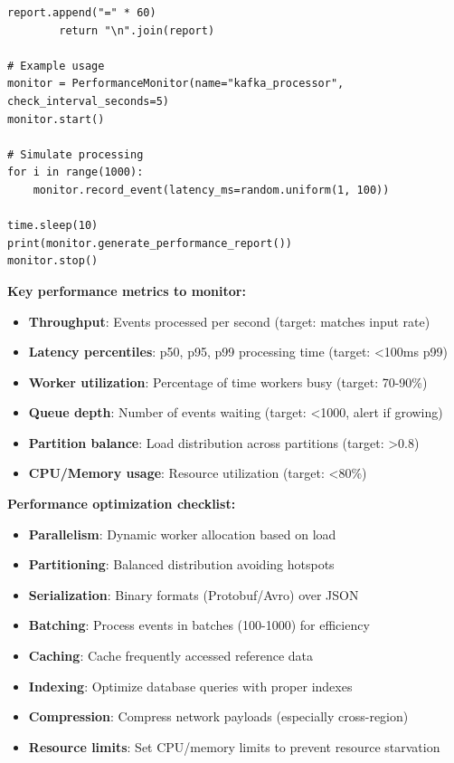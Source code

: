 \begin{lstlisting}[style=python, caption={Performance Monitor with Bottleneck Detection}]
        report.append("=" * 60)
        return "\n".join(report)

# Example usage
monitor = PerformanceMonitor(name="kafka_processor", check_interval_seconds=5)
monitor.start()

# Simulate processing
for i in range(1000):
    monitor.record_event(latency_ms=random.uniform(1, 100))

time.sleep(10)
print(monitor.generate_performance_report())
monitor.stop()
\end{lstlisting}

\textbf{Key performance metrics to monitor:}
\begin{itemize}
    \item \textbf{Throughput}: Events processed per second (target: matches input rate)
    \item \textbf{Latency percentiles}: p50, p95, p99 processing time (target: <100ms p99)
    \item \textbf{Worker utilization}: Percentage of time workers busy (target: 70-90\%)
    \item \textbf{Queue depth}: Number of events waiting (target: <1000, alert if growing)
    \item \textbf{Partition balance}: Load distribution across partitions (target: >0.8)
    \item \textbf{CPU/Memory usage}: Resource utilization (target: <80\%)
\end{itemize}

\textbf{Performance optimization checklist:}
\begin{itemize}
    \item \textbf{Parallelism}: Dynamic worker allocation based on load
    \item \textbf{Partitioning}: Balanced distribution avoiding hotspots
    \item \textbf{Serialization}: Binary formats (Protobuf/Avro) over JSON
    \item \textbf{Batching}: Process events in batches (100-1000) for efficiency
    \item \textbf{Caching}: Cache frequently accessed reference data
    \item \textbf{Indexing}: Optimize database queries with proper indexes
    \item \textbf{Compression}: Compress network payloads (especially cross-region)
    \item \textbf{Resource limits}: Set CPU/memory limits to prevent resource starvation
\end{itemize}

